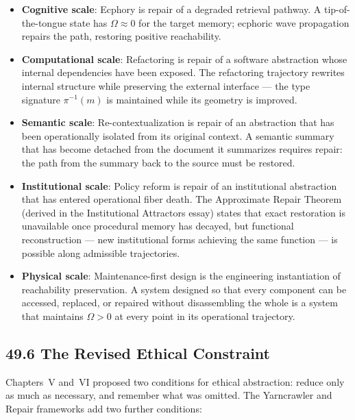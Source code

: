 \documentclass[12pt,letterpaper]{article}
\theoremstyle{remark}
\begin{document}
\begin{itemize}
\item \textbf{Cognitive scale}: Ecphory is repair of a degraded
  retrieval pathway. A tip-of-the-tongue state has $\Omega \approx
  0$ for the target memory; ecphoric wave propagation repairs the
  path, restoring positive reachability.

\item \textbf{Computational scale}: Refactoring is repair of a
  software abstraction whose internal dependencies have been
  exposed. The refactoring trajectory rewrites internal structure
  while preserving the external interface — the type signature
  $\pi^{-1}(m)$ is maintained while its geometry is improved.

\item \textbf{Semantic scale}: Re-contextualization is repair of
  an abstraction that has been operationally isolated from its
  original context. A semantic summary that has become detached
  from the document it summarizes requires repair: the path from
  the summary back to the source must be restored.

\item \textbf{Institutional scale}: Policy reform is repair of an
  institutional abstraction that has entered operational fiber
  death. The Approximate Repair Theorem (derived in the
  Institutional Attractors essay) states that exact restoration is
  unavailable once procedural memory has decayed, but functional
  reconstruction — new institutional forms achieving the same
  function — is possible along admissible trajectories.

\item \textbf{Physical scale}: Maintenance-first design is the
  engineering instantiation of reachability preservation. A system
  designed so that every component can be accessed, replaced, or
  repaired without disassembling the whole is a system that
  maintains $\Omega > 0$ at every point in its operational
  trajectory.
\end{itemize}

\subsection{49.6 The Revised Ethical Constraint}

Chapters~V and~VI proposed two conditions for ethical abstraction:
reduce only as much as necessary, and remember what was omitted.
The Yarncrawler and Repair frameworks add two further conditions:
\end{document}
